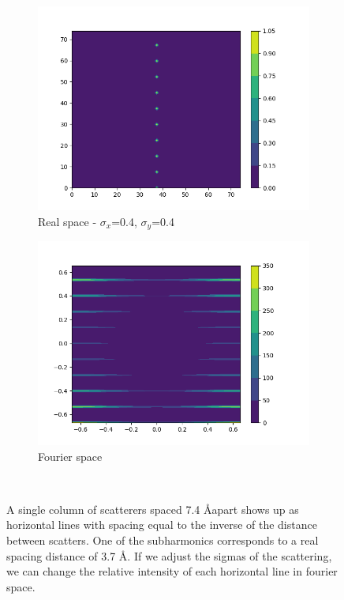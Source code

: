 \documentclass{article}
\begin{document}
\begin{figure}[h]
\begin{subfigure}{0.45\textwidth}
                \includegraphics[width=\textwidth]{real_2d_1column_74_highxysig.png}
                \caption{Real space - $\sigma_x$=0.4, $\sigma_y$=0.4}\label{fig:real_2d_1column_75_highxysig}
        \end{subfigure}
        \begin{subfigure}{0.45\textwidth}
                \centering
                \includegraphics[width=\textwidth]{fourier_2d_1column_74_highxysig.png}
                \caption{Fourier space}\label{fig:fourier_2d_74_1column_highxysig}
        \end{subfigure}
        \caption{A single column of scatterers spaced 7.4 \AA apart shows up as horizontal lines
                 with spacing equal to the inverse of the distance between scatters. One of the
                 subharmonics corresponds to a real spacing distance of 3.7 \AA. If we adjust the 
	         sigmas of the scattering, we can change the relative intensity of each
                 horizontal line in fourier space.}~\label{fig:2d_columns_offset}
\end{figure}
\end{document}
